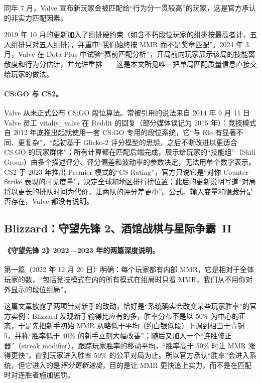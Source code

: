 同年 7 月，Valve 宣布新玩家会被匹配给“行为分一贯较高”的玩家\cite{valve2017newplayers}\tagOff，这是官方承认的非实力匹配因素。

2019 年 10 月的更新加入了组排硬约束（如含不朽段位玩家的组排按最高者计、五人组排只对五人组排），并重申“我们始终按 MMR 而不是奖章匹配”\cite{valve2019matchmaking}\tagOff。2024 年 3 月，Valve 在 Dota Plus 中试验“赛前匹配分析”，开局前向玩家展示该局的技能离散度和行为分估计，并允许重排\cite{valve2024matchmaking}\tagOff——这是本文所见唯一把单局匹配质量信息直接交给玩家的做法。

\paragraph{CS:GO 与 CS2。}
Valve 从未正式公布 CS:GO 段位算法。常被引用的说法来自 2014 年 9 月 11 日 Valve 员工 vitaliy\_valve 在 Reddit 的回复（部分媒体误记为 2015 年\cite{pcgamer2021csgo}）：竞技模式自 2012 年底推出起就使用一套 CS:GO 专用的段位系统，它“与 Elo 有显著不同、更复杂”，“起初基于 Glicko-2 评分模型的思想，之后不断改进以更适合 CS:GO 的玩家群体”；所有计算都在匹配后端完成，展示给玩家的“技能组”（Skill Group）由多个描述评分、评分偏差和波动率的参数决定，无法用单个数字表示\cite{vitaliy2014comment}\tagOff。CS2 于 2023 年推出 Premier 模式的“CS Rating”，官方只说它是“对你 Counter-Strike 表现的可见度量”，决定全球和地区排行榜位置\cite{valve2023cs2rating}\tagOff；此后的更新说明写道“对局将以更长的排队时间为代价，让两队的评分差更小”\cite{valve2023cs2notes}\tagOff。公式、输入变量和隐藏分是否存在，Valve 都没有说明。

\subsection{Blizzard：守望先锋 2、酒馆战棋与\mbox{星际争霸 II}}
\label{sec:ch1b-blizzard}

\paragraph{《守望先锋 2》2022—2023 年的两篇深度说明。}
第一篇（2022 年 12 月 20 日）明确：每个玩家都有内部 MMR，它是相对于全体玩家的数，“包括竞技模式在内的所有模式在组局时只看 MMR，我们从不用你对外显示的段位组局”\cite{blizzard2022overwatch}\tagOff。

这篇文章披露了两项针对新手的改动，恰好是“系统确实会改变某些玩家胜率”的官方实例：Blizzard 发现新手输得比应有的多，胜率分布不是以 50\% 为中心的正态，于是先把新手初始 MMR 从略低于平均（约白银低段）下调到相当于青铜 5，并称“胜率低于 40\% 的新手立刻大幅改善”；随后又加入一个“连胜修正器”（streak modifier），跟踪玩家胜率的移动平均，“胜率高于 50\% 时让 MMR 涨得更快”，直到玩家进入胜率 50\% 的公平对局为止\tagOff。所以官方承认“胜率”会进入系统，但它进入的是\emph{评分更新速度}，目的是让 MMR 更快追上实力，而不是在匹配时对连胜者施加惩罚。

